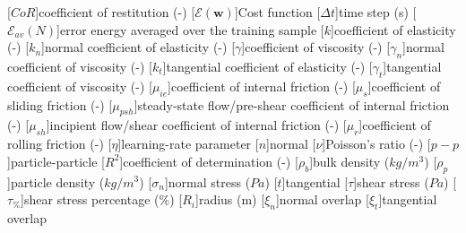 \begin{multicols}{2}
\begin{acronym}[FOOBAR]
	[$CoR$]{coefficient of restitution (-)}
	[$\mathscr{E}(\mathbf{w})$]{Cost function}
	[$\Delta t$]{time step (s)}
	[$\mathscr{E}_{av}(N)$]{error energy averaged over the training
	sample}
	[$k$]{coefficient of elasticity (-)}
	[$k_n$]{normal coefficient of elasticity (-)}
	[$\gamma$]{coefficient of viscosity (-)}	
	[$\gamma_n$]{normal coefficient of viscosity (-)}
	[$k_t$]{tangential coefficient of elasticity (-)}
	[$\gamma_t$]{tangential coefficient of viscosity (-)}	
	[$\mu_{ie}$]{coefficient of internal friction (-)} 
	[$\mu_s$]{coefficient of sliding friction (-)}
	[$\mu_{psh}$]{steady-state flow/pre-shear coefficient of internal
	friction (-)} 
	[$\mu_{sh}$]{incipient flow/shear coefficient of internal
	friction (-)}
	[$\mu_r$]{coefficient of rolling friction (-)}
	[$\eta$]{learning-rate parameter}
	[$n$]{normal}
	[$\nu$]{Poisson's ratio (-)}
	[$p-p$]{particle-particle}
	[$R^2$]{coefficient of determination (-)}
	[$\rho_b$]{bulk density ($kg/m^3$)}
	[$\rho_p$]{particle density ($kg/m^3$)}
	[$\sigma_n$]{normal stress ($Pa$)}
	[$t$]{tangential}
	[$\tau$]{shear stress ($Pa$)}
	[$\tau_{\%}$]{shear stress percentage ($\%$)}
	[$R_i$]{radius (m)}
	[$\xi_n$]{normal overlap}
	[$\xi_t$]{tangential overlap}

% 	
\end{acronym}
\end{multicols}
